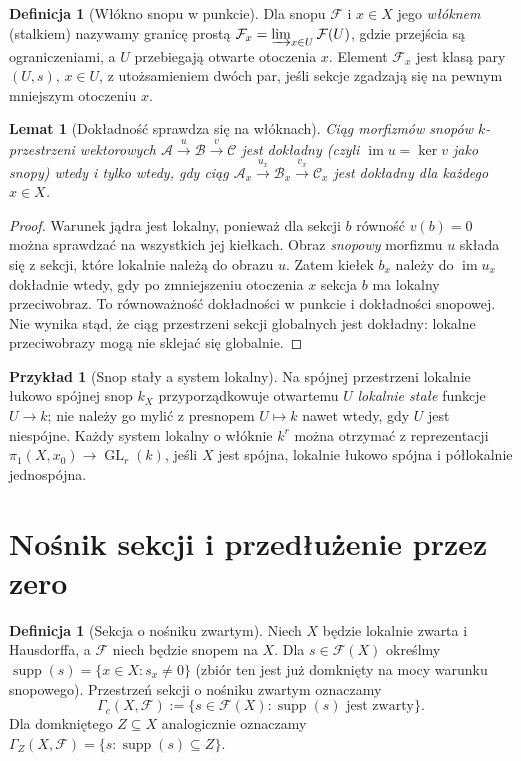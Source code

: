 \documentclass[11pt,a4paper,oneside]{report}
\theoremstyle{plain}
\newtheorem{lemat}[twierdzenie]{Lemat}
\theoremstyle{definition}
\newtheorem{definicja}[twierdzenie]{Definicja}
\newtheorem{przyklad}[twierdzenie]{Przykład}
\theoremstyle{remark}
\begin{document}
\begin{definicja}[Włókno snopu w punkcie]
Dla snopu $\mathcal F$ i $x\in X$ jego \emph{włóknem} (stalkiem)
nazywamy granicę prostą
$\mathcal F_x=\varinjlim_{x\in U}\mathcal F(U)$, gdzie przejścia
są ograniczeniami, a $U$ przebiegają otwarte otoczenia $x$.
Element $\mathcal F_x$ jest klasą pary $(U,s)$, $x\in U$,
z utożsamieniem dwóch par, jeśli sekcje zgadzają się
na pewnym mniejszym otoczeniu $x$.
\end{definicja}

\begin{lemat}[Dokładność sprawdza się na włóknach]
\label{lem:stalk-exact-v12}
Ciąg morfizmów snopów $k$-przestrzeni wektorowych
$\mathcal A\xrightarrow{u}\mathcal B\xrightarrow{v}\mathcal C$
jest dokładny (czyli $\operatorname{im}u=\ker v$ jako snopy)
wtedy i tylko wtedy, gdy ciąg
$\mathcal A_x\xrightarrow{u_x}\mathcal B_x\xrightarrow{v_x}\mathcal C_x$
jest dokładny dla każdego $x\in X$.
\end{lemat}
\begin{proof}
Warunek jądra jest lokalny, ponieważ dla sekcji $b$ równość $v(b)=0$
można sprawdzać na wszystkich jej kiełkach. Obraz \emph{snopowy}
morfizmu $u$ składa się z sekcji, które lokalnie należą do obrazu $u$.
Zatem kiełek $b_x$ należy do $\operatorname{im}u_x$ dokładnie wtedy,
gdy po zmniejszeniu otoczenia $x$ sekcja $b$ ma lokalny przeciwobraz.
To równoważność dokładności w punkcie i dokładności snopowej.
Nie wynika stąd, że ciąg przestrzeni sekcji globalnych jest dokładny:
lokalne przeciwobrazy mogą nie sklejać się globalnie.
\end{proof}

\begin{przyklad}[Snop stały a system lokalny]
Na spójnej przestrzeni lokalnie łukowo spójnej snop $k_X$
przyporządkowuje otwartemu $U$ \emph{lokalnie stałe} funkcje $U\to k$;
nie należy go mylić z presnopem $U\mapsto k$ nawet wtedy,
gdy $U$ jest niespójne. Każdy system lokalny o włóknie $k^r$
można otrzymać z reprezentacji
$\pi_1(X,x_0)\to\operatorname{GL}_r(k)$,
jeśli $X$ jest spójna, lokalnie łukowo spójna i półlokalnie jednospójna.
\end{przyklad}

\section{Nośnik sekcji i przedłużenie przez zero}
\begin{definicja}[Sekcja o nośniku zwartym]
\label{def:gamma-c-v12}
Niech $X$ będzie lokalnie zwarta i Hausdorffa, a $\mathcal F$
niech będzie snopem na $X$. Dla $s\in\mathcal F(X)$ określmy
$\operatorname{supp}(s)=\{x\in X:s_x\ne0\}$
(zbiór ten jest już domknięty na mocy warunku snopowego).
Przestrzeń sekcji o nośniku zwartym oznaczamy
\[\Gamma_c(X,\mathcal F)
  :=\{s\in\mathcal F(X):\operatorname{supp}(s)\text{ jest zwarty}\}.\]
Dla domkniętego $Z\subseteq X$ analogicznie oznaczamy
$\Gamma_Z(X,\mathcal F)=\{s:\operatorname{supp}(s)\subseteq Z\}$.
\end{definicja}
\end{document}
